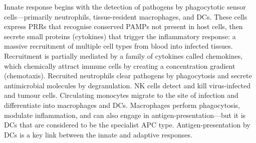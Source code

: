 Innate response begins with the detection of pathogens by phagocytotic sensor cells---primarily neutrophils, tissue-resident macrophages, and \glspl{DC}.
These cells express \glspl{PRR} that recognise conserved \glspl{PAMP} not present in host cells,
then secrete small proteins (cytokines) that trigger the inflammatory response:
a massive recruitment of multiple cell types from blood into infected tissues.
Recruitment is partially mediated by a family of cytokines called chemokines, which chemically attract immune cells by creating a concentration gradient (chemotaxis). 
Recruited neutrophils clear pathogens by phagocytosis and secrete antimicrobial molecules by degranulation.
\Gls{NK} cells detect and kill virus-infected and tumour cells.
Circulating monocytes migrate to the site of infection and differentiate into macrophages and \glspl{DC}.
Macrophages perform phagocytosis, modulate inflammation, and can also engage in antigen-presentation---but it is \glspl{DC} that are considered to be the specialist \gls{APC} type.
Antigen-presentation by \glspl{DC} is a key link between the innate and adaptive responses.

